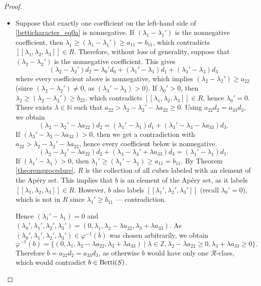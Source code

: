 \documentclass[12pt]{article}
\theoremstyle{remark}
\begin{document}
\begin{proof}
\begin{itemize}
    \item 
    Suppose that exactly one coefficient on the left-hand side of \eqref{betticharacter_eq0a} is nonnegative. If $(\lambda_1-\lambda_1')$ is the nonnegative coefficient, then $\lambda_1 \geq  (\lambda_1-\lambda_1') \geq a_{11}=b_{11}$, which contradicts $[[\lambda_1,\lambda_2,\lambda_3]] \in R$. Therefore, without loss of generality, suppose that $(\lambda_2-\lambda_2')$ is the nonnegative coefficient. This gives 
    \begin{equation}
          (\lambda_2-\lambda_2')d_2    = \lambda_0'd_0 + (\lambda_1'-\lambda_1)d_1 + (\lambda_3'-\lambda_3)d_3
    \end{equation}
    where every coefficient above is nonnegative, which implies $ (\lambda_2-\lambda_2') \geq a_{22}$ (since $(\lambda_2-\lambda_2') \neq 0$, as $(\lambda_3'-\lambda_3) > 0$). If $\lambda_0' > 0$, then $\lambda_2 \geq  (\lambda_2-\lambda_2') \geq b_{22}$, which contradicts $[[\lambda_1,\lambda_2,\lambda_3]] \in R$, hence $\lambda_0' = 0$.  
    There exists $\lambda \in \mathbb{N}$ such that $a_{22} > \lambda_2-\lambda_2' - \lambda a_{22} \geq 0$. Using $a_{22}d_2 = a_{33}d_3$, we obtain 
    \begin{equation}
          (\lambda_2-\lambda_2'- \lambda a_{22} )d_2    =  (\lambda_1'-\lambda_1)d_1 + (\lambda_3'-\lambda_3-\lambda a_{33} )d_3.
    \end{equation}
    If $(\lambda_3'-\lambda_3-\lambda a_{33} ) > 0$, then we get a contradiction with $a_{22} > \lambda_2-\lambda_2' - \lambda a_{22}$, hence every coefficient below is nonnegative.
    \begin{equation}
          (\lambda_2-\lambda_2'- \lambda a_{22} )d_2 + ( \lambda_3 -\lambda_3'+ \lambda a_{33})d_3    =  (\lambda_1'-\lambda_1)d_1.
    \end{equation}
    If $(\lambda_1'-\lambda_1) >0$, then $\lambda_1' \geq (\lambda_1'-\lambda_1) \geq a_{11} = b_{11}$. By Theorem \ref{theoremprocedure}, $R$ is the collection of all cubes labeled with an element of the Ap{\'e}ry set. This implies that $b$ is an element of the Ap{\'e}ry set, as it labels $[[\lambda_1,\lambda_2,\lambda_3]] \in R$. However, $b$ also labels $[[\lambda_1',\lambda_2',\lambda_3']]$ (recall $\lambda_0' = 0$), which is not in $R$ since $\lambda_1' \geq b_{11}$ --- contradiction.

    Hence $(\lambda_1'-\lambda_1) = 0$ and $(\lambda_0',\lambda_1',\lambda_2', \lambda_3') = (0,\lambda_1,\lambda_2 - \lambda a_{22} , \lambda_3 + \lambda a_{33} )$. As $(\lambda_0',\lambda_1',\lambda_2', \lambda_3') \in \varphi^{-1}(b)$ was chosen arbitrarily, we obtain
    \begin{equation}\label{betticharacter_factor}
        \varphi^{-1}(b) = \{ (0,\lambda_1,\lambda_2 - \lambda a_{22} , \lambda_3 + \lambda a_{33} ) \mid \lambda \in \mathbb{Z}, \lambda_2 - \lambda a_{22} \geq 0 , \lambda_3 + \lambda a_{33} \geq 0\}.
    \end{equation}
    Therefore $b = a_{22}d_2 = a_{33}d_3$, as otherwise $b$ would have only one $\mathcal{R}$-class, which would contradict $b \in \textup{Betti}(S)$.


\end{itemize}
\end{proof}
\end{document}
